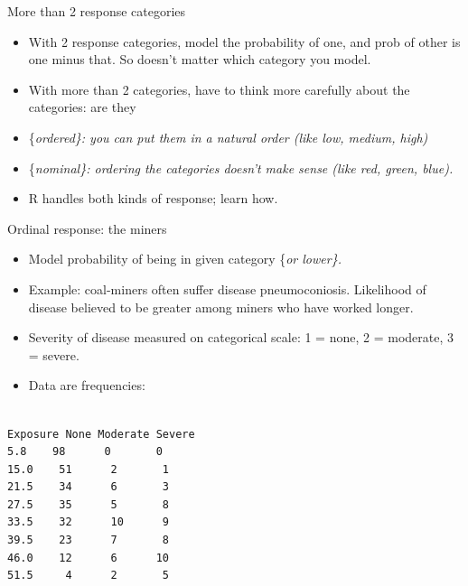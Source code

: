 \documentclass[ignorenonframetext,]{beamer}
\begin{document}
\begin{frame}{More than 2 response categories}
\protect\hypertarget{more-than-2-response-categories}{}

\begin{itemize}
\item
  With 2 response categories, model the probability of one, and prob of
  other is one minus that. So doesn't matter which category you model.
\item
  With more than 2 categories, have to think more carefully about the
  categories: are they
\item
  \{\em ordered\}: you can put them in a natural order (like low,
  medium, high)
\item
  \{\em nominal\}: ordering the categories doesn't make sense (like red,
  green, blue).
\item
  R handles both kinds of response; learn how.
\end{itemize}

\end{frame}

\begin{frame}[fragile]{Ordinal response: the miners}
\protect\hypertarget{ordinal-response-the-miners}{}

\begin{itemize}
\item
  Model probability of being in given category \{\em or lower\}.
\item
  Example: coal-miners often suffer disease pneumoconiosis. Likelihood
  of disease believed to be greater among miners who have worked longer.
\item
  Severity of disease measured on categorical scale: 1 = none, 2 =
  moderate, 3 = severe.
\item
  Data are frequencies:
\end{itemize}

\begin{verbatim}

Exposure None Moderate Severe
5.8    98      0       0
15.0    51      2       1
21.5    34      6       3
27.5    35      5       8
33.5    32      10      9
39.5    23      7       8
46.0    12      6      10
51.5     4      2       5
\end{verbatim}

\end{frame}
\end{document}
